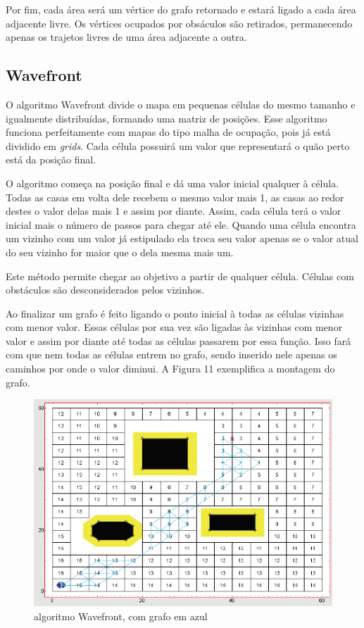 Por fim, cada área será um vértice do grafo retornado e estará ligado a cada área adjacente livre.  Os vértices ocupados por obsáculos são retirados, permanecendo apenas os trajetos livres de uma área adjacente a outra.

\subsection{Wavefront}

O algoritmo Wavefront divide o mapa em pequenas células do mesmo tamanho e igualmente distribuídas, formando uma matriz de posições. Esse algoritmo funciona perfeitamente com mapas do tipo malha de ocupação, pois já está dividido em \textit{grids}. Cada célula possuirá um valor que representará o quão perto está da posição final.

O algoritmo começa na posição final e dá uma valor inicial qualquer à célula. Todas as casas em volta dele recebem o mesmo valor mais 1, as casas ao redor destes o valor delas mais 1 e assim por diante. Assim, cada célula terá o valor inicial mais o número de passos para chegar até ele. Quando uma célula encontra um vizinho com um valor já estipulado ela troca seu valor apenas se o valor atual do seu vizinho for maior que o dela mesma mais um.

Este método permite chegar ao objetivo a partir de qualquer célula. Células com obstáculos são desconsiderados pelos vizinhos. 

Ao finalizar um grafo é feito ligando o ponto inicial à todas as células vizinhas com menor valor. Essas células por sua vez são ligadas às vizinhas com menor valor e assim por diante até todas as células passarem por essa função. Isso fará com que nem todas as células entrem no grafo, sendo inserido nele apenas os caminhos por onde o valor diminui. A Figura 11 exemplifica a montagem do grafo.

\begin{figure}[h]
	\centering
	\label{fig11}
		\includegraphics[keepaspectratio=true,scale=0.5]{figuras/10wavefront.png}
	\caption{algoritmo Wavefront, com grafo em azul \cite{MRIT_SITE}}
\end{figure}

